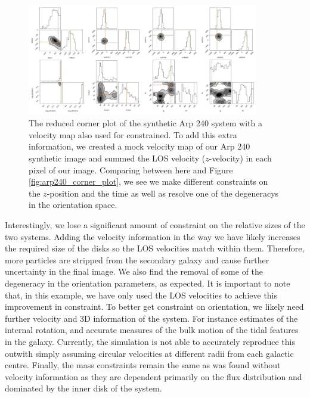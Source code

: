\begin{figure}
    \centering
    \includegraphics[width=0.9\textwidth]{Chapter1/figures/Arp240_vel-red-corner.pdf}
    \caption[The reduced corner plot of the synthetic Arp 240 system with a velocity map also used for constrained.]{The reduced corner plot of the synthetic Arp 240 system with a velocity map also used for constrained. To add this extra information, we created a mock velocity map of our Arp 240 synthetic image and summed the LOS velocity ($z$-velocity) in each pixel of our image. Comparing between here and Figure \ref{fig:arp240_corner_plot}, we see we make different constraints on the $z$-position and the time as well as resolve one of the degeneracys in the orientation space.}
    \label{fig:velocity_corner_plot}
\end{figure}

Interestingly, we lose a significant amount of constraint on the relative sizes of the two systems. Adding the velocity information in the way we have likely increases the required size of the disks so the LOS velocities match within them. Therefore, more particles are stripped from the secondary galaxy and cause further uncertainty in the final image. We also find the removal of some of the degeneracy in the orientation parameters, as expected. It is important to note that, in this example, we have only used the LOS velocities to achieve this improvement in constraint. To better get constraint on orientation, we likely need further velocity and 3D information of the system. For instance estimates of the internal rotation, and accurate measures of the bulk motion of the tidal features in the galaxy. Currently, the simulation is not able to accurately reproduce this outwith simply assuming circular velocities at different radii from each galactic centre. Finally, the mass constraints remain the same as was found without velocity information as they are dependent primarily on the flux distribution and dominated by the inner disk of the system.


